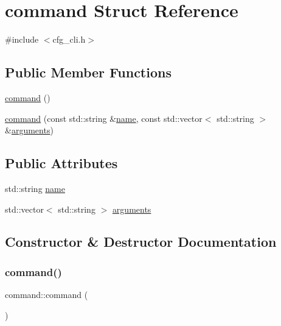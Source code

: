 \hypertarget{structcommand}{}\section{command Struct Reference}
\label{structcommand}


{\ttfamily \#include $<$cfg\+\_\+cli.\+h$>$}

\subsection*{Public Member Functions}
\begin{DoxyCompactItemize}
\item 
\mbox{\hyperlink{structcommand_ae20034718c8c8ec1596167a49aa7ca8e}{command}} ()
\item 
\mbox{\hyperlink{structcommand_a123d32fbc6e9ef2c5428a6c262cb103e}{command}} (const std\+::string \&\mbox{\hyperlink{structcommand_a4318703934a246cbc84031bb6a705bf0}{name}}, const std\+::vector$<$ std\+::string $>$ \&\mbox{\hyperlink{structcommand_a97c554ee8ed96d32c6cc180574d6c63d}{arguments}})
\end{DoxyCompactItemize}
\subsection*{Public Attributes}
\begin{DoxyCompactItemize}
\item 
std\+::string \mbox{\hyperlink{structcommand_a4318703934a246cbc84031bb6a705bf0}{name}}
\item 
std\+::vector$<$ std\+::string $>$ \mbox{\hyperlink{structcommand_a97c554ee8ed96d32c6cc180574d6c63d}{arguments}}
\end{DoxyCompactItemize}


\subsection{Constructor \& Destructor Documentation}
\mbox{\label{structcommand_ae20034718c8c8ec1596167a49aa7ca8e}} 
\subsubsection{\texorpdfstring{command()}{command()}\hspace{0.1cm}{\footnotesize\ttfamily [1/2]}}
{\footnotesize\ttfamily command\+::command (\begin{DoxyParamCaption}{ }\end{DoxyParamCaption})\hspace{0.3cm}{\ttfamily [inline]}}

